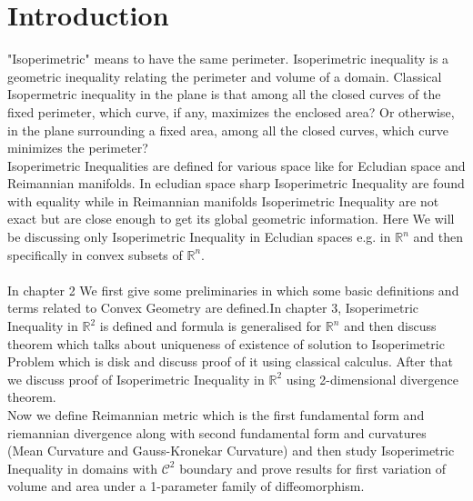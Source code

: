 \documentclass[oneside]{book}
\begin{document}
\chapter{Introduction}
\label{chap:c1}

 "Isoperimetric" means to have the same perimeter. Isoperimetric  inequality is a geometric inequality relating  the perimeter and volume of a domain. Classical Isopermetric inequality in the plane is that among all the closed curves of the fixed perimeter, which curve, if any, maximizes the enclosed area? Or otherwise, in the plane surrounding a fixed area, among all the closed curves, which curve minimizes the perimeter? \\
 
Isoperimetric Inequalities are defined for various space like for Ecludian space and Reimannian manifolds. In ecludian space sharp Isoperimetric Inequality are found with equality while in Reimannian manifolds Isoperimetric Inequality are not exact but are close enough to get its global geometric information. Here We will be discussing only  Isoperimetric Inequality in Ecludian spaces e.g. in  $\mathbb{R}^{n}$ and then specifically in convex subsets of $\mathbb{R}^{n}$.
\\
\\
In chapter 2 We first give some preliminaries in which some basic definitions and terms related to Convex Geometry are defined.In chapter 3, Isoperimetric Inequality in $\mathbb{R}^2$ is defined and formula is generalised for $\mathbb{R}^n$ and then discuss theorem which talks about uniqueness of existence of solution to Isoperimetric Problem which is disk and discuss proof of it using classical calculus. After that we discuss proof of Isoperimetric Inequality in $\mathbb{R}^2$  using 2-dimensional divergence theorem. \\
Now we define Reimannian metric which is the first fundamental form and  riemannian divergence  along with second fundamental form and curvatures (Mean Curvature and Gauss-Kronekar Curvature) and then study Isoperimetric Inequality in domains with $\mathcal{C}^2 $ boundary and prove  results for first variation  of volume and area under a 1-parameter family of diffeomorphism.
\end{document}
